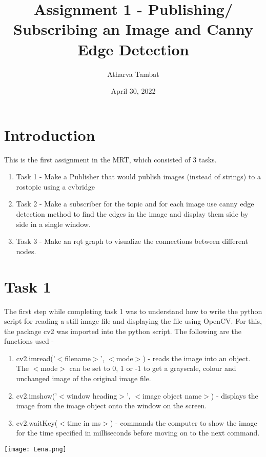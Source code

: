 \documentclass{article}
\title{Assignment 1 - Publishing/ Subscribing an Image and Canny Edge Detection}
\author{Atharva Tambat}
\date{April 30, 2022}
\begin{document}
\maketitle

\section{Introduction}
This is the first assignment in the MRT, which consisted of 3 tasks.
\begin{enumerate}
    \item Task 1 - Make a Publisher that would publish images (instead of strings) to a rostopic using a cvbridge
    \item Task 2 - Make a subscriber for the topic and for each image use canny edge detection method to find the edges in the image and display them side by side in a single window.
    \item Task 3 - Make an rqt graph to visualize the connections between different nodes.
\end{enumerate}

\section{Task 1}
The first step while completing task 1 was to understand how to write the python script for reading a still image file and displaying the file using OpenCV. For this, the package cv2 was imported into the python script. The following are the functions used -

\begin{enumerate}
    \item cv2.imread('$<$filename$>$', $<$mode$>$) - reads the image into an object. The $<$mode$>$ can be set to 0, 1 or -1 to get a grayscale, colour and unchanged image of the original image file.
    \item cv2.imshow('$<$window heading$>$', $<$image object name$>$) - displays the image from the image object onto the window on the screen.
    \item cv2.waitKey($<$time in ms$>$) - commands the computer to show the image for the time specified in milliseconds before moving on to the next command. 
\end{enumerate}

\begin{center}
    \texttt{[image: Lena.png]}
\end{center}
\end{document}
